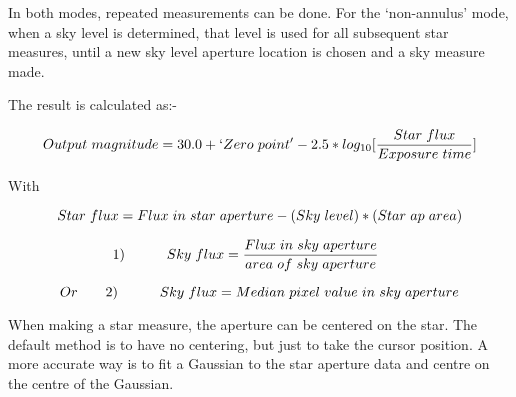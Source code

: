 \begin{small}
{{  In both modes, repeated measurements can be done. For the
  `non-annulus' mode, when a sky level is determined, that level is
  used for all subsequent star measures, until a new sky level
  aperture location is chosen and a sky measure made.

  
   The result is calculated as:-

   $$ Output{\hspace{0.3em}}magnitude = 30.0 + `Zero{\hspace{0.3em}}point' 
      - 2.5*log_{10}[\frac{Star{\hspace{0.3em}}flux}{Exposure{
      \hspace{0.3em}}time}] $$

 With

$$ Star{\hspace{0.3em}}flux = 
   Flux{\hspace{0.3em}}in{\hspace{0.3em}}star{\hspace{0.3em}}aperture -
   (Sky{\hspace{0.3em}}level)*(Star{\hspace{0.3em}}ap{\hspace{0.3em}}area) $$

$$ {\hspace*{-2em}}     
   1) {\hspace*{3em}}   Sky{\hspace{0.3em}}flux  =
     \frac{Flux{\hspace{0.3em}}in{\hspace{0.3em}}sky{
     \hspace{0.3em}}aperture}{area{\hspace{0.3em}}of{\hspace{0.3em}}sky{
     \hspace{0.3em}}aperture} $$

$$   Or {\hspace*{2em}}   2) {\hspace*{3em}} Sky{\hspace{0.3em}}flux  = 
     Median{\hspace{0.3em}}pixel{\hspace{0.3em}}value{\hspace{0.3em}}in{
     \hspace{0.3em}}sky{\hspace{0.3em}}aperture  $$
                                                                              
   When making a star measure, the aperture can be centered on the star.
   The default method is to have no centering, but just to take the
   cursor position. A more accurate way is to fit a Gaussian to the
   star aperture data and centre on the centre of the Gaussian.
                                                                              
}}
\end{small}
